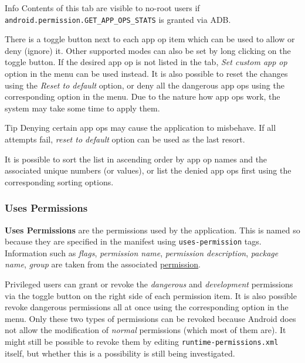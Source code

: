\begin{tip}{Info}
    Contents of this tab are visible to no-root users if \texttt{android.permission.GET\_APP\_OPS\_STATS} is granted via ADB\@.
\end{tip}

There is a toggle button next to each app op item which can be used to allow or deny (ignore) it. Other supported modes
can also be set by long clicking on the toggle button. If the desired app op is not listed in the tab,
\textit{Set custom app op} option in the menu can be used instead. It is also possible to reset the changes
using the \textit{Reset to default} option, or deny all the dangerous app ops using the corresponding option in the menu.
Due to the nature how app ops work, the system may take some time to apply them.

\begin{tip}{Tip}
    Denying certain app ops may cause the application to misbehave. If all attempts fail, \textit{reset to default}
    option can be used as the last resort.
\end{tip}

It is possible to sort the list in ascending order by app op names and the associated unique numbers (or values), or
list the denied app ops first using the corresponding sorting options.


\subsubsection{Uses Permissions} %
\textbf{Uses Permissions} are the permissions used by the application. This is named so because they are specified in
the manifest using \texttt{uses-permission} tags. Information such as \textit{flags}, \textit{permission name},
\textit{permission description}, \textit{package name}, \textit{group} are taken from the associated
\hyperref[subsubsec:permissions]{permission}.

Privileged users can grant or revoke the \textit{dangerous} and \textit{development} permissions via the toggle button
on the right side of each permission item. It is also possible revoke dangerous permissions all at once using the
corresponding option in the menu. Only these two types of permissions can be revoked because Android does not allow
the modification of \textit{normal} permissions (which most of them are). It might still be possible to revoke them
by editing \texttt{runtime-permissions.xml} itself, but whether this is a possibility is still being investigated.

